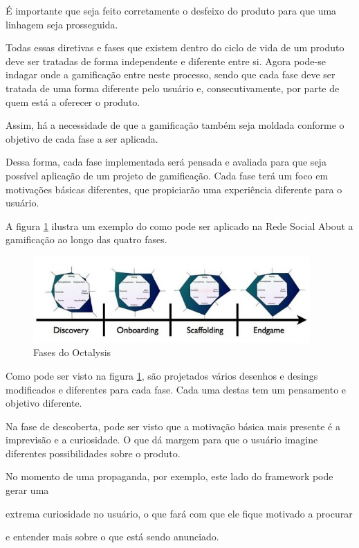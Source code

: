 É importante que seja feito corretamente o desfeixo do produto para que uma linhagem seja
prosseguida.


Todas essas diretivas e fases que existem dentro do ciclo de vida de um produto 
deve ser
tratadas de forma independente e diferente entre si. Agora pode-se indagar onde 
a gamificação
entre neste processo, sendo que cada fase deve ser tratada de uma forma diferente pelo
usuário e, consecutivamente, por parte de quem está a oferecer o produto.

Assim, há a necessidade de que a gamificação também seja moldada conforme o objetivo de
cada fase a ser aplicada.

Dessa forma, cada fase implementada será pensada e avaliada para que seja possível 
aplicação de um  projeto de gamificação. Cada fase terá um foco em motivações
básicas diferentes, que propiciarão uma experiência diferente para o usuário.

A figura \ref{fig:fasesoctalysis} ilustra um exemplo do como pode ser aplicado na
Rede Social About a gamificação ao longo das quatro fases.

\begin{figure}[h]
    \centering
    \includegraphics[width=400px, scale=1]{figuras/fasesoctalysis}
    \caption{Fases do Octalysis}
    \label{fig:fasesoctalysis}
\end{figure}

Como pode ser visto na figura \ref{fig:fasesoctalysis}, são projetados vários
desenhos e desings modificados e diferentes para cada fase. Cada uma destas
tem um pensamento e objetivo diferente.

Na fase de descoberta, pode ser visto que a motivação básica mais presente é
a imprevisão e a curiosidade. O que dá margem para que o usuário imagine diferentes
possibilidades sobre o produto. 

No momento de uma propaganda, por exemplo, este lado do framework pode gerar uma

extrema curiosidade no usuário, o que fará com que ele fique motivado a procurar

e entender mais sobre o que está sendo anunciado.

